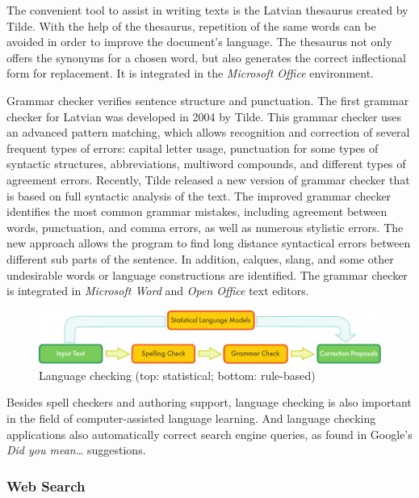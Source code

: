 \begin{multicols}{2}
The convenient tool to assist in writing texts is the Latvian thesaurus created by Tilde.
With the help of the thesaurus, repetition of the same words can be avoided in order to improve the document's language.
The thesaurus not only offers the synonyms for a chosen word, but also generates the correct inflectional form for replacement.
It is integrated in the \textit{Microsoft Office} environment.

Grammar checker verifies sentence structure and punctuation.
The first grammar checker for Latvian was developed in 2004 by Tilde.
This grammar checker uses an advanced pattern matching, which allows recognition and correction of several frequent types of errors: capital letter usage, punctuation for some types of syntactic structures, abbreviations, multiword compounds, and different types of agreement errors.
Recently, Tilde released a new version of grammar checker that is based on full syntactic analysis of the text.
The improved grammar checker identifies the most common grammar mistakes, including agreement between words, punctuation, and comma errors, as well as numerous stylistic errors.
The new approach allows the program to find long distance syntactical errors between different sub parts of the sentence.
In addition, calques, slang, and some other undesirable words or language constructions are identified.
The grammar checker is integrated in \textit{Microsoft Word} and \textit{Open Office} text editors.

\begin{figure}[htb]
  \center
  \includegraphics[width=\textwidth]{../_media/english/language_checking}
  \caption{Language checking (top: statistical; bottom: rule-based)}
  \label{fig:langcheckingaarch_en}
\end{figure}

Besides spell checkers and authoring support, language checking is also important in the field of computer-assisted language learning.
And language checking applications also automatically correct search engine queries, as found in Google's \textit{Did you mean\dots } suggestions.

\subsubsection{Web Search}


\end{multicols}
